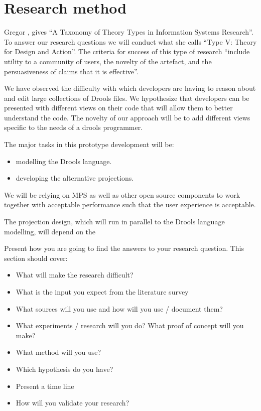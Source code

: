 \section{Research method} 

Gregor \cite{gregor2006nature}, gives “A Taxonomy of Theory Types in Information Systems Research”. 
To answer our research questions we will conduct what she calls “Type V: Theory for Design and Action”. 
The criteria for success of this type of research “include utility to a community of users, the novelty of the artefact, and the persuasiveness of claims that it is effective”.

We have observed the difficulty with which developers are having to reason about and edit large collections of Drools files.
We hypothesize that developers can be presented with different views on their code that will allow them to better understand the code.
The novelty of our approach will be to add different views specific to the needs of a drools programmer.

The major tasks in this prototype development will be: 
\begin{itemize}
    \item modelling the Drools language.
    \item developing the alternative projections.
\end{itemize}

We will be relying on MPS as well as other open source components to work together with acceptable performance such that the user experience is acceptable.

The projection design, which will run in parallel to the Drools language modelling, will depend on the 

Present how you are going to find the answers to your research question. This section should cover:
\begin{itemize}
    \item What will make the research difficult?
    \item What is the input you expect from the literature survey
    \item What sources will you use and how will you use / document them?
    \item What experiments / research will you do? What proof of concept will you make?
	\item What method will you use?
	\item Which hypothesis do you have?
    \item Present a time line
	\item How will you validate your research?
\end{itemize}
